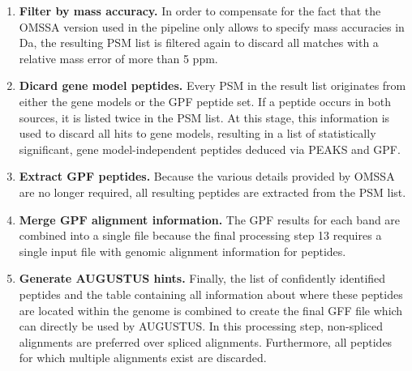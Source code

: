 \begin{enumerate}
\item {\bf Filter by mass accuracy.} 
In order to compensate for the fact that the OMSSA version used in the pipeline
only allows to specify mass accuracies in Da, the resulting PSM list is
filtered again to discard all matches with a relative mass error of more
than 5 ppm.

\item {\bf Dicard gene model peptides.} 
Every PSM in the result list originates from either the gene models or the
GPF peptide set. If a peptide occurs in both sources, it is listed twice in
the PSM list.
At this stage, this information is used to discard all hits to gene models,
resulting in a list of statistically significant, gene model-independent 
peptides deduced via PEAKS and GPF.

\item {\bf Extract GPF peptides.} 
Because the various details provided by OMSSA are no longer required,
all resulting peptides are extracted from the PSM list.

\item {\bf Merge GPF alignment information.} 
The GPF results for each band are combined into a single file because the
final processing step 13 requires a single input file with genomic alignment
information for peptides.

\item {\bf Generate AUGUSTUS hints.} 
Finally, the list of confidently identified peptides and the table containing
all information about where these peptides are located within the genome
is combined to create the final GFF file which can directly be used by AUGUSTUS.
In this processing step, non-spliced alignments are preferred over spliced 
alignments.
Furthermore, all peptides for which multiple alignments exist are discarded.

\end{enumerate}

